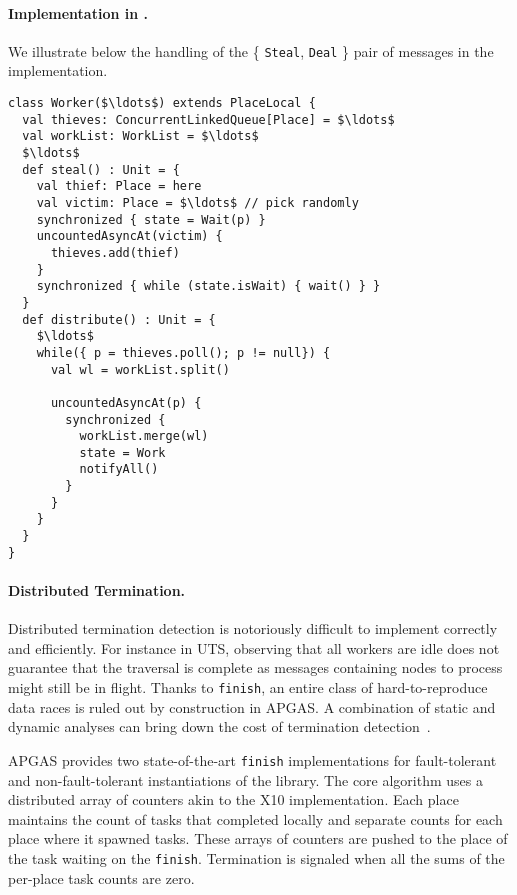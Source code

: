 \paragraph{Implementation in \apgas.}

We illustrate below the handling of the \{ \lstinline{Steal}, \lstinline{Deal} \} pair of messages in the \apgas implementation.
\begin{lstlisting}
class Worker($\ldots$) extends PlaceLocal {
  val thieves: ConcurrentLinkedQueue[Place] = $\ldots$
  val workList: WorkList = $\ldots$
  $\ldots$
  def steal() : Unit = {
    val thief: Place = here
    val victim: Place = $\ldots$ // pick randomly
    synchronized { state = Wait(p) }
    uncountedAsyncAt(victim) {
      thieves.add(thief)
    }
    synchronized { while (state.isWait) { wait() } }
  }
  def distribute() : Unit = {
    $\ldots$ 
    while({ p = thieves.poll(); p != null}) {
      val wl = workList.split()

      uncountedAsyncAt(p) {
        synchronized {
          workList.merge(wl)
          state = Work
          notifyAll()
        }
      }
    }
  }
}
\end{lstlisting}

\paragraph{Distributed Termination.} Distributed termination detection is notoriously difficult to implement correctly and efficiently.
For instance in UTS, observing that all workers are idle does not guarantee that the traversal is complete as messages containing nodes to process might still be in flight. Thanks to \lstinline{finish}, an entire class of hard-to-reproduce data races is ruled out by construction in APGAS.
A combination of static and dynamic analyses can bring down the cost of termination detection~\cite{TardieuETAL14X10ApgasAtPetascale}. 

APGAS provides two state-of-the-art \lstinline{finish} implementations for fault-tolerant and non-fault-tolerant instantiations of the library. The core algorithm uses a distributed array of counters akin to the X10 implementation. Each place maintains the count of tasks that completed locally and separate counts for each place where it spawned tasks. These arrays of counters are pushed to the place of the task waiting on the \lstinline{finish}. Termination is signaled when all the sums of the per-place task counts are zero.


% 
% 
% 
% 
% 



